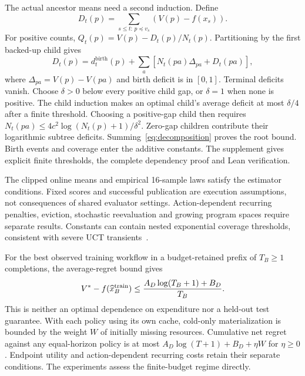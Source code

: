 The actual ancestor means need a second induction. Define
\begin{equation}
D_t(p)=\sum_{s\le t:\,p\preceq v_s}(V(p)-f(x_s)).
\label{eq:deficit}
\end{equation}
For positive counts, $Q_t(p)=V(p)-D_t(p)/N_t(p)$. Partitioning by the
first backed-up child gives
\begin{equation}
D_t(p)=d_t^{\mathrm{birth}}(p)+
\sum_a[N_t(pa)\Delta_{pa}+D_t(pa)],
\label{eq:decomposition}
\end{equation}
where $\Delta_{pa}=V(p)-V(pa)$ and birth deficit is in $[0,1]$.
Terminal deficits vanish. Choose $\delta>0$ below every positive child
gap, or $\delta=1$ when none is positive. The child induction makes an
optimal child's average deficit at most $\delta/4$ after a finite threshold.
Choosing a positive-gap child then requires
$N_t(pa)\le4c^2\log(N_t(p)+1)/\delta^2$.
Zero-gap children contribute their logarithmic subtree deficits.
Summing~\eqref{eq:decomposition} proves the root bound. Birth events and
coverage enter the additive constants. The supplement gives explicit finite
thresholds, the complete dependency proof and Lean verification.

The clipped online means and empirical 16-sample laws satisfy the estimator
conditions. Fixed scores and successful publication are execution assumptions,
not consequences of shared evaluator settings. Action-dependent recurring
penalties, eviction, stochastic reevaluation and growing program spaces
require separate results. Constants can contain nested exponential coverage
thresholds, consistent with severe UCT transients~\citep{coquelin2007bandit}.

For the best observed training workflow in a budget-retained prefix of
$T_B\ge1$ completions, the average-regret bound gives
\begin{equation}
V^*-f(\widehat x_B^{\rm train})
\le\frac{A_D\log(T_B+1)+B_D}{T_B}.
\label{eq:budget-training-gap}
\end{equation}
This is neither an optimal dependence on expenditure nor a held-out test
guarantee. With each policy using its own cache, cold-only materialization is bounded
by the weight $W$ of initially missing resources. Cumulative net regret
against any equal-horizon policy is at most
$A_D\log(T+1)+B_D+\eta W$ for $\eta\ge0$.
Endpoint utility and action-dependent recurring costs retain their separate
conditions. The experiments assess the finite-budget regime directly.



